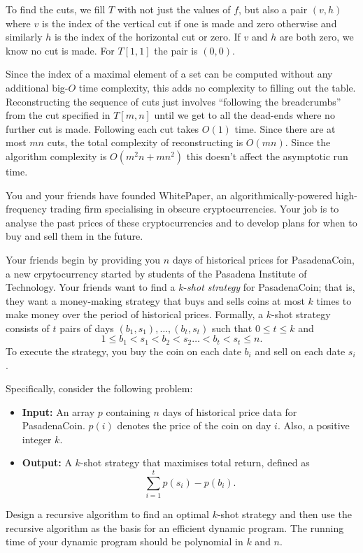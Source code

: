 \documentclass[12 pt, letterpaper]{hmcpset}
\begin{document}
\begin{solution}
	To find the cuts, we fill $T$ with not just the values of $f$, but also a pair $(v, h)$ where $v$ is the index of the vertical cut if one is made and zero otherwise and similarly $h$ is the index of the horizontal cut or zero. If $v$ and $h$ are both zero, we know no cut is made. For $T[1, 1]$ the pair is $(0, 0)$. 

	Since the index of a maximal element of a set can be computed without any additional big-$O$ time complexity, this adds no complexity to filling out the table. Reconstructing the sequence of cuts just involves ``following the breadcrumbs'' from the cut specified in $T[m, n]$ until we get to all the dead-ends where no further cut is made. Following each cut takes $O(1)$ time. Since there are at most $mn$ cuts, the total complexity of reconstructing is $O(mn)$. Since the algorithm complexity is $O(m^{2} n + m n^{2})$ this doesn't affect the asymptotic run time.
\end{solution}

\pagebreak

\begin{problem}
	You and your friends have founded WhitePaper, an algorithmically-powered high-frequency trading firm specialising in obscure cryptocurrencies. Your job is to analyse the past prices of these cryptocurrencies and to develop plans for when to buy and sell them in the future.

	Your friends begin by providing you $n$ days of historical prices for PasadenaCoin, a new crpytocurrency started by students of the Pasadena Institute of Technology. Your friends want to find a $k$-\emph{shot strategy} for PasadenaCoin; that is, they want a money-making strategy that buys and sells coins at most $k$ times to make money over the period of historical prices. Formally, a $k$-shot strategy consists of $t$ pairs of days $(b_{1}, s_{1}), \dots, (b_{t}, s_{t})$ such that $0 \le t \le k$ and
	\[
		1 \le b_{1} < s_{1} < b_{2} < s_{2} \dots < b_{t} < s_{t} \le n.
	\]
	To execute the strategy, you buy the coin on each date $b_{i}$ and sell on each date $s_{i}$.

	Specifically, consider the following problem:
	\begin{itemize}
		\item \textbf{Input:} An array $p$ containing $n$ days of historical price data for PasadenaCoin. $p(i)$ denotes the price of the coin on day $i$. Also, a positive integer $k$.

		\item \textbf{Output:} A $k$-shot strategy that maximises total return, defined as
			\[
				\sum_{i = 1}^{t} p(s_{i}) - p(b_{i}).
			\]
	\end{itemize}

	Design a recursive algorithm to find an optimal $k$-shot strategy and then use the recursive algorithm as the basis for an efficient dynamic program. The running time of your dynamic program should be polynomial in $k$ and $n$.
\end{problem}
\end{document}
